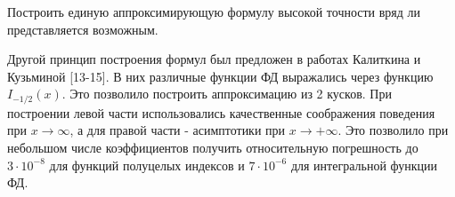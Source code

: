 Построить единую аппроксимирующую формулу высокой точности
вряд ли представляется возможным. 

Другой принцип построения формул был предложен в работах Калиткина и Кузьминой [13-15]. В них различные функции ФД выражались через функцию $I_{-1/2}(x)$. Это позволило построить аппроксимацию из 2 кусков. При построении левой части использовались качественные соображения поведения при $x \to \infty$, а для правой части - асимптотики при $x \to +\infty$. Это позволило при небольшом числе коэффициентов получить относительную погрешность до $3·10^{-8}$ для функций полуцелых индексов и $7·10^{-6}$ для интегральной функции ФД.

